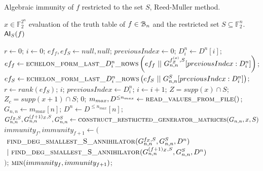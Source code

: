 \documentclass[11pt]{llncs}
\begin{document}
\begin{algorithm}[H]
\small
	\caption{Algebraic immunity of $f$ restricted to the set $S$, Reed-Muller method. \label{alg:RMApproach}}
	\begin{algorithmic}[1]
		\Require $x\in \mathbb{F}_2^{2^n}$ evaluation of the truth table of $f\in \mathcal{B}_{n}$ and the restricted set $S\subseteq \mathbb{F}_2^n$.
		\Ensure $\mathsf{AI}_S(f)$
		
		\State $r \gets 0$;
		\State $i \gets 0$;
		\State $ef_f, ef_S \gets null, null$;
		\State $previousIndex \gets 0$;
		\State $D_i^n \gets D^n[i]$;
		\State $ef_f\gets \mbox{\textsc{echelon\_form\_last\_}}D_i^n\mbox{\textsc{\_rows}}\left(ef_f\ ||\  G_{n,n}^{f_Z^{(o)},S}[previousIndex:D_i^n]\right)$\footnotemark;
		\State $ef_S \gets \mbox{\textsc{echelon\_form\_last\_}}D_i^n\mbox{\textsc{\_rows}}\left(ef_S\ ||\ G_{n,n}^S[previousIndex:D_i^n]\right)$;
		\State $r \gets rank\left(ef_S\right)$;
		\State
		\Return $i$;
		\EndIf
		\State $previousIndex \gets D_i^n$;
		\State $i \gets i+1$;
		\EndWhile
		\EndFunction
        \State
        \State $Z = supp(x)\cap S$;
        \State $Z_c = supp(x+1) \cap S$;
		\Return $0$;
		\EndIf
		\State $m_{max}, D^{\leq n_{max}}\gets \mbox{\textsc{read\_values\_from\_file}}()$;
		\State $G_{n,n}\gets m_{max}[n]$;
		\State $D^n \gets D^{\leq n_{max}}[n]$;
        \State $G_{n,n}^{f_Z,S}, G_{n,n}^{(f+ 1)_Z,S}, G_{n,n}^S \gets \textsc{construct\_restricted\_generator\_matrices}(G_{n,n},x,S)$\footnotemark\;
		\State $immunity_f, immunity_{f+1} \leftarrow ($\\
		$\ \mbox{\textsc{find\_deg\_smallest\_S\_annihilator}}(G_{n,n}^{f_Z,S}, G_{n,n}^S,D^{n})$\\
		$\ |\ \mbox{\textsc{find\_deg\_smallest\_S\_annihilator}}(G_{n,n}^{(f+ 1)_Z,S}, G_{n,n}^S, D^{n})$\\
		$)$;
		\State \Return $\mbox{\textsc{min}}(immunity_f, immunity_{f+1})$\footnotemark;
	\end{algorithmic}
\end{algorithm}
\end{document}
